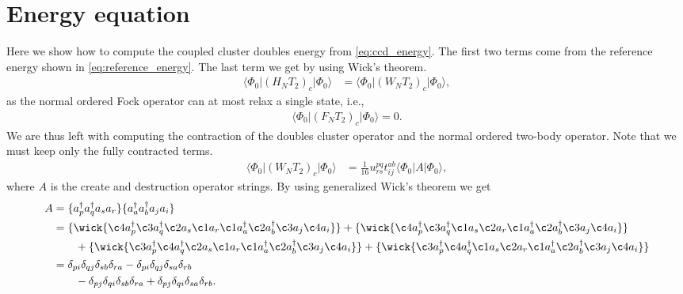 \documentclass[
    a4paper, aps, twocolumn, floatfix, superscriptaddress,
    nofootinbib]{revtex4-1}
\newcommand{\1}{\mathds{1}}
\newcommand{\bra}[1]{\langle #1\lvert}
\newcommand{\ket}[1]{\rvert #1\rangle}
\newcommand{\acr}[1]{a_{#1}^{\dagger}}
\newcommand{\ade}[1]{a_{#1}}
\newcommand{\kslat}{\ket{\Phi_0}}
\newcommand{\bslat}{\bra{\Phi_0}}
\begin{document}
\section{Energy equation}
    \label{app:energy_equation}
    Here we show how to compute the coupled cluster doubles energy from
    \autoref{eq:ccd_energy}. The first two terms come from the reference energy
    shown in \autoref{eq:reference_energy}. The last term we get by using Wick's
    theorem.
    \begin{align}
        \bslat (H_N T_2)_c\kslat
        &= \bslat (W_N T_2)_c\kslat,
    \end{align}
    as the normal ordered Fock operator can at most relax a single state, i.e.,
    \begin{align}
        \bslat (F_N T_2)_c\kslat = 0.
    \end{align}
    We are thus left with computing the contraction of the doubles cluster
    operator and the normal ordered two-body operator. Note that we must keep
    only the fully contracted terms.
    \begin{align}
        \bslat (W_N T_2)_c\kslat
        &=
        \frac{1}{16} u^{pq}_{rs} t^{ab}_{ij}
        \bslat
        A
        \kslat,
        \label{eq:third_term_ccd_energy}
    \end{align}
    where $A$ is the create and destruction operator strings. By using
    generalized Wick's theorem we get
    \begin{align}
        A &=
        \{\acr{p}\acr{q}\ade{s}\ade{r}\}
        \{\acr{a}\acr{b}\ade{j}\ade{i}\}
        \nonumber \\
        &=
        \{
            \wick{
                    \c4 a_p^{\dagger} \c3 a_q^{\dagger}
                    \c2 a_s \c1 a_r
                    \c1 a_a^{\dagger} \c2 a_b^{\dagger}
                    \c3 a_j \c4 a_i
            }
        \}
        +
        \{
            \wick{
                    \c4 a_p^{\dagger} \c3 a_q^{\dagger}
                    \c1 a_s \c2 a_r
                    \c1 a_a^{\dagger} \c2 a_b^{\dagger}
                    \c3 a_j \c4 a_i
            }
        \}
        \nonumber \\
        &\qquad
        +
        \{
            \wick{
                    \c3 a_p^{\dagger} \c4 a_q^{\dagger}
                    \c2 a_s \c1 a_r
                    \c1 a_a^{\dagger} \c2 a_b^{\dagger}
                    \c3 a_j \c4 a_i
            }
        \}
        +
        \{
            \wick{
                    \c3 a_p^{\dagger} \c4 a_q^{\dagger}
                    \c1 a_s \c2 a_r
                    \c1 a_a^{\dagger} \c2 a_b^{\dagger}
                    \c3 a_j \c4 a_i
            }
        \}
        \nonumber \\
        &=
        \delta_{pi}\delta_{qj}\delta_{sb}\delta_{ra}
        - \delta_{pi}\delta_{qj}\delta_{sa}\delta_{rb}
        \nonumber \\
        &\qquad
        - \delta_{pj}\delta_{qi}\delta_{sb}\delta_{ra}
        + \delta_{pj}\delta_{qi}\delta_{sa}\delta_{rb}.
    \end{align}
\end{document}
